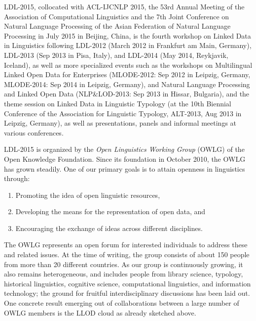 LDL-2015, collocated with ACL-IJCNLP 2015, the 53rd Annual Meeting of the Association of Computational Linguistics and the 7th Joint Conference on Natural Language Processing of the Asian Federation of Natural Language Processing in July 2015 in Beijing, China, is the fourth workshop on Linked Data in Linguistics following LDL-2012 (March 2012 in Frankfurt am Main, Germany), LDL-2013 (Sep 2013 in Pisa, Italy),
and LDL-2014 (May 2014, Reykjavik, Iceland), as well as more specialized events such as the workshops on Multilingual Linked Open Data for Enterprises (MLODE-2012: Sep 2012 in Leipzig, Germany, MLODE-2014: Sep 2014 in Leipzig, Germany), and Natural Language Processing and Linked Open Data (NLP\&LOD-2013: Sep 2013 in Hissar, Bulgaria), and the theme session on Linked Data in Linguistic Typology (at the 10th Biennial Conference of the Association for Linguistic Typology, ALT-2013, Aug 2013 in Leipzig, Germany), as well as presentations, panels and informal meetings at various conferences.

LDL-2015 is organized by the \emph{Open Linguistics Working Group} (OWLG) of the Open Knowledge Foundation. Since its foundation in October 2010, the OWLG has grown steadily. One of our primary goals is to attain openness in linguistics through:

\begin{enumerate}
\item Promoting the idea of open linguistic resources,
\item Developing the means for the representation of open data, and
\item Encouraging the exchange of ideas across different disciplines.
\end{enumerate}

The OWLG represents an open forum for interested individuals to address these and related issues.
At the time of writing, the group consists of about 150 	%
people from more than 20 									%
different countries.
As our group is continuously growing, it also remains heterogeneous, and includes people from library science, typology, historical linguistics, cognitive science, computational linguistics, and information technology; the ground for fruitful interdisciplinary discussions has been laid out.
One concrete result emerging out of collaborations between a large number of OWLG members is the LLOD cloud as already sketched above.

